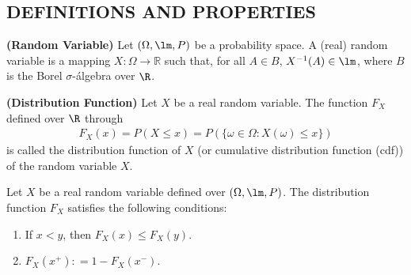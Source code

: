 \subsection{DEFINITIONS AND PROPERTIES}
\begin{definition}{\bf (Random Variable)}
   Let $(\Omega, \lm, P)$ be a probability space. A (real) random variable is a mapping $X\colon \Omega \to \mathbb{R}$
   such that, for all $A\in B$, $X^{-1}(A)\in \lm$, where $B$ is the Borel $\sigma$-\'algebra over $\R$.
\end{definition}

\begin{definition}{\bf (Distribution Function)}
   Let $X$ be a real random variable. The function $F_{X}$ defined over $\R$ through
   \begin{align}
      F_{X}(x) = P(X\leq x) = P(\{\omega\in \Omega\colon X(\omega)\leq x\})
   \end{align}
   is called the distribution function of $X$ (or cumulative distribution function (cdf)) of the random variable $X$.
\end{definition}


\begin{theorem}
   Let $X$ be a real random variable defined over $(\Omega, \lm, P)$. The distribution function
   $F_{X}$ satisfies the following conditions:
   \begin{enumerate}[{\rm i.}]
      \item If $x<y$, then $F_{X}(x)\leq F_{X}(y)$.
      \item $F_{X}(x^{+}) \colon = 1 - F_{X}(x^{-})$.
   \end{enumerate}
\end{theorem}
